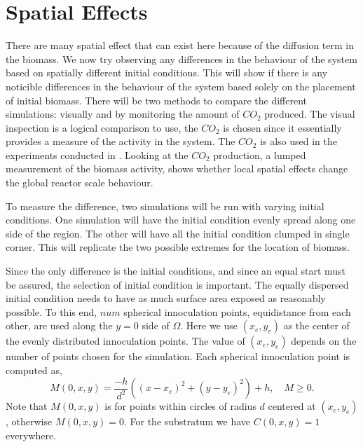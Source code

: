 \section{Spatial Effects}

There are many spatial effect that can exist here because of the diffusion term in the biomass.
We now try observing any differences in the behaviour of the system based on spatially different initial conditions.
This will show if there is any noticible differences in the behaviour of the system based solely on the placement of initial biomass.
There will be two methods to compare the different simulations: visually and by monitoring the amount of $CO_2$ produced.
The visual inspection is a logical comparison to use, the $CO_2$ is chosen since it essentially provides a measure of the activity in the system.
The $CO_2$ is also used in the experiments conducted in \cite{dumitrache2014understanding}.
Looking at the $CO_2$ production, a lumped measurement of the biomass activity, shows whether local spatial effects change the global reactor scale behaviour.

To measure the difference, two simulations will be run with varying initial conditions.
One simulation will have the initial condition evenly spread along one side of the region.
The other will have all the initial condition clumped in single corner.
This will replicate the two possible extremes for the location of biomass.


Since the only difference is the initial conditions, and since an equal start must be assured, the selection of initial condition is important.
The equally dispersed initial condition needs to have as much surface area exposed as reasonably possible.
To this end, $num$ spherical innoculation points, equidistance from each other, are used along the $y=0$ side of $\Omega$.
Here we use $(x_e, y_e)$ as the center of the evenly distributed innoculation points.
The value of $(x_e, y_e)$ depends on the number of points chosen for the simulation.
Each spherical innoculation point is computed as,
\begin{equation}
M(0,x,y) = \frac{-h}{d^2} ((x-x_e)^2 +(y-y_e)^2) + h, \quad M \ge 0.
\end{equation}
Note that $M(0,x,y)$ is for points within circles of radius $d$ centered at $(x_e, y_e)$, otherwise $M(0,x,y) = 0$.
For the substratum we have $C(0,x,y) = 1$ everywhere.

